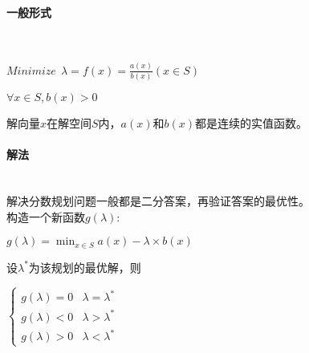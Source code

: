 \paragraph{一般形式}~{}
\\
\begin{center}$Minimize\ \ \lambda = f(x) = \frac{a(x)}{b(x)} (x \in S)$\end{center}
\begin{center}$\forall x \in S, b(x)>0$\end{center}
解向量$x$在解空间$S$内，$a(x)$和$b(x)$都是连续的实值函数。

\paragraph{解法}~{}
\\
解决分数规划问题一般都是二分答案，再验证答案的最优性。\\
构造一个新函数$g(\lambda)$:
\begin{center}$g(\lambda)=\min_{x \in S}{a(x)- \lambda \times b(x)}$\end{center}
设$\lambda ^{*}$为该规划的最优解，则
\begin{center}
$
\begin{cases}
g(\lambda)=0 & \lambda = \lambda ^{*}\\
g(\lambda)<0 & \lambda > \lambda ^{*}\\
g(\lambda)>0 & \lambda < \lambda ^{*}
\end{cases}
$
\end{center}